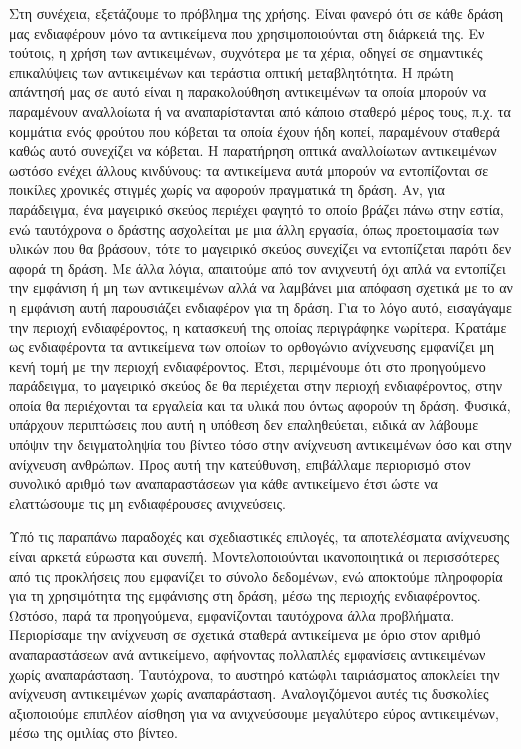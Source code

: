 \documentclass[11pt,a4paper,english,greek,twoside]{../Thesis}
\begin{document}
\par Στη συνέχεια, εξετάζουμε το πρόβλημα της χρήσης. Είναι φανερό ότι σε κάθε δράση μας ενδιαφέρουν μόνο τα αντικείμενα που χρησιμοποιούνται στη διάρκειά της. Εν τούτοις, η χρήση των αντικειμένων, συχνότερα με τα χέρια, οδηγεί σε σημαντικές επικαλύψεις των αντικειμένων και τεράστια οπτική μεταβλητότητα. Η πρώτη απάντησή μας σε αυτό είναι η παρακολούθηση αντικειμένων τα οποία μπορούν να παραμένουν αναλλοίωτα ή να αναπαρίστανται από κάποιο σταθερό μέρος τους, π.χ. τα κομμάτια ενός φρούτου που κόβεται τα οποία έχουν ήδη κοπεί, παραμένουν σταθερά καθώς αυτό συνεχίζει να κόβεται. Η παρατήρηση οπτικά αναλλοίωτων αντικειμένων ωστόσο ενέχει άλλους κινδύνους: τα αντικείμενα αυτά μπορούν να εντοπίζονται σε ποικίλες χρονικές στιγμές χωρίς να αφορούν πραγματικά τη δράση. Αν, για παράδειγμα, ένα μαγειρικό σκεύος περιέχει φαγητό το οποίο βράζει πάνω στην εστία, ενώ ταυτόχρονα ο δράστης ασχολείται με μια άλλη εργασία, όπως προετοιμασία των υλικών που θα βράσουν, τότε το μαγειρικό σκεύος συνεχίζει να εντοπίζεται παρότι δεν αφορά τη δράση. Με άλλα λόγια, απαιτούμε από τον ανιχνευτή όχι απλά να εντοπίζει την εμφάνιση ή μη των αντικειμένων αλλά να λαμβάνει μια απόφαση σχετικά με το αν η εμφάνιση αυτή παρουσιάζει ενδιαφέρον για τη δράση. Για το λόγο αυτό, εισαγάγαμε την περιοχή ενδιαφέροντος, η κατασκευή της οποίας περιγράφηκε νωρίτερα. Κρατάμε ως ενδιαφέροντα τα αντικείμενα των οποίων το ορθογώνιο ανίχνευσης εμφανίζει μη κενή τομή με την περιοχή ενδιαφέροντος. Έτσι, περιμένουμε ότι στο προηγούμενο παράδειγμα, το μαγειρικό σκεύος δε θα περιέχεται στην περιοχή ενδιαφέροντος, στην οποία θα περιέχονται τα εργαλεία και τα υλικά που όντως αφορούν τη δράση. Φυσικά, υπάρχουν περιπτώσεις που αυτή η υπόθεση δεν επαληθεύεται, ειδικά αν λάβουμε υπόψιν την δειγματοληψία του βίντεο τόσο στην ανίχνευση αντικειμένων όσο και στην ανίχνευση ανθρώπων. Προς αυτή την κατεύθυνση, επιβάλλαμε περιορισμό στον συνολικό αριθμό των αναπαραστάσεων για κάθε αντικείμενο έτσι ώστε να ελαττώσουμε τις μη ενδιαφέρουσες ανιχνεύσεις.

\par Υπό τις παραπάνω παραδοχές και σχεδιαστικές επιλογές, τα αποτελέσματα ανίχνευσης είναι αρκετά εύρωστα και συνεπή. Μοντελοποιούνται ικανοποιητικά οι περισσότερες από τις προκλήσεις που εμφανίζει το σύνολο δεδομένων, ενώ αποκτούμε πληροφορία για τη χρησιμότητα της εμφάνισης στη δράση, μέσω της περιοχής ενδιαφέροντος. Ωστόσο, παρά τα προηγούμενα, εμφανίζονται ταυτόχρονα άλλα προβλήματα. Περιορίσαμε την ανίχνευση σε σχετικά σταθερά αντικείμενα με όριο στον αριθμό αναπαραστάσεων ανά αντικείμενο, αφήνοντας πολλαπλές εμφανίσεις αντικειμένων χωρίς αναπαράσταση. Ταυτόχρονα, το αυστηρό κατώφλι ταιριάσματος αποκλείει την ανίχνευση αντικειμένων χωρίς αναπαράσταση. Αναλογιζόμενοι αυτές τις δυσκολίες αξιοποιούμε επιπλέον αίσθηση για να ανιχνεύσουμε μεγαλύτερο εύρος αντικειμένων, μέσω της ομιλίας στο βίντεο.
\end{document}
